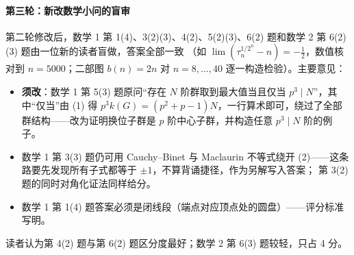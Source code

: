 \paragraph{第三轮：新改数学小问的盲审}
第二轮修改后，数学 1 第 1(4)、3(2)(3)、4(2)、5(2)(3)、6(2) 题和数学 2 第 6(2)(3) 题由一位新的读者盲做，答案全部一致
（如 $\lim(\tau_n^{1/2^n}-n)=-\frac12$，数值核对到 $n=5000$；二部图 $b(n)=2n$ 对 $n=8,\dots,40$ 逐一构造检验）。主要意见：
\begin{itemize}
  \item \textbf{须改}：数学 1 第 5(3) 题原问“存在 $N$ 阶群取到最大值当且仅当 $p^3\mid N$”，其中“仅当”由 (1) 得
        $p^3k(G)=(p^2+p-1)N$，一行算术即可，绕过了全部群结构——改为证明换位子群是 $p$ 阶中心子群，并构造任意 $p^3\mid N$ 阶的例子。
  \item 数学 1 第 3(3) 题仍可用 Cauchy–Binet 与 Maclaurin 不等式绕开 (2)——这条路要先发现所有子式都等于 $\pm1$，不算背诵捷径，作为另解写入答案；
        第 3(2) 题的同时对角化证法同样给分。
  \item 数学 1 第 1(4) 题答案必须是闭线段（端点对应顶点处的圆盘）——评分标准写明。
\end{itemize}
读者认为第 4(2) 题与第 6(2) 题区分度最好；数学 2 第 6(3) 题较轻，只占 4 分。
